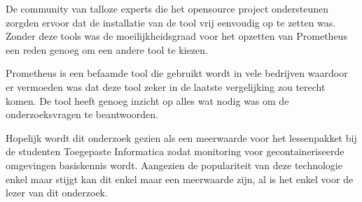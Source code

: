 De community van talloze experts die het opensource project ondersteunen zorgden ervoor dat de installatie van de tool vrij eenvoudig op te zetten was. Zonder deze tools was de moeilijkheidsgraad voor het opzetten van Prometheus een reden genoeg om een andere tool te kiezen. 

Prometheus is een befaamde tool die gebruikt wordt in vele bedrijven waardoor er vermoeden was dat deze tool zeker in de laatste vergelijking zou terecht komen. De tool heeft genoeg inzicht op alles wat nodig was om de onderzoeksvragen te beantwoorden.

Hopelijk wordt dit onderzoek gezien als een meerwaarde voor het lessenpakket bij de studenten Toegepaste Informatica zodat monitoring voor gecontaineriseerde omgevingen basiskennis wordt. Aangezien de populariteit van deze technologie enkel maar stijgt kan dit enkel maar een meerwaarde zijn, al is het enkel voor de lezer van dit onderzoek.



